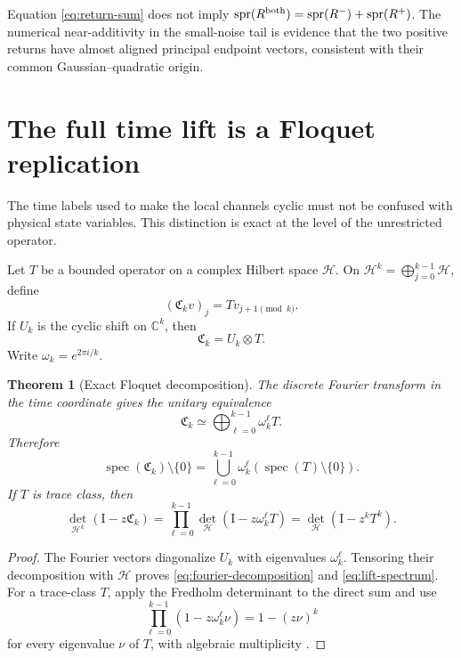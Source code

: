 \documentclass[11pt]{article}
\newtheorem{theorem}{Theorem}[section]
\theoremstyle{definition}
\theoremstyle{remark}
\newcommand{\C}{\mathbb C}
\newcommand{\Id}{\mathrm I}
\newcommand{\cH}{\mathcal H}
\newcommand{\spec}{\operatorname{spec}}
\newcommand{\spr}{\operatorname{spr}}
\begin{document}
Equation \eqref{eq:return-sum} does not imply
$\spr(R^{\rm both})=\spr(R^-)+\spr(R^+)$.  The numerical near-additivity in
the small-noise tail is evidence that the two positive returns have almost
aligned principal endpoint vectors, consistent with their common
Gaussian--quadratic origin.

\section{The full time lift is a Floquet replication}
\label{sec:floquet}

The time labels used to make the local channels cyclic must not be confused
with physical state variables.  This distinction is exact at the level of
the unrestricted operator.

Let $T$ be a bounded operator on a complex Hilbert space $\cH$.  On
$\cH^k=\bigoplus_{j=0}^{k-1}\cH$, define
\begin{equation}\label{eq:full-time-lift}
 (\mathfrak C_kv)_j=Tv_{j+1\pmod k}.
\end{equation}
If $U_k$ is the cyclic shift on $\C^k$, then
\begin{equation}\label{eq:tensor-lift}
 \mathfrak C_k=U_k\otimes T.
\end{equation}
Write $\omega_k=e^{2\pi i/k}$.

\begin{theorem}[Exact Floquet decomposition]
\label{thm:floquet}
The discrete Fourier transform in the time coordinate gives the unitary
equivalence
\begin{equation}\label{eq:fourier-decomposition}
 \boxed{
 \mathfrak C_k\simeq
 \bigoplus_{\ell=0}^{k-1}\omega_k^\ell T.}
\end{equation}
Therefore
\begin{equation}\label{eq:lift-spectrum}
 \spec(\mathfrak C_k)\setminus\{0\}
 =\bigcup_{\ell=0}^{k-1}
 \omega_k^\ell(\spec(T)\setminus\{0\}).
\end{equation}
If $T$ is trace class, then
\begin{equation}\label{eq:lift-determinant}
 \boxed{
 \det_{\cH^k}(\Id-z\mathfrak C_k)
 =\prod_{\ell=0}^{k-1}
 \det_{\cH}(\Id-z\omega_k^\ell T)
 =\det_{\cH}(\Id-z^kT^k).}
\end{equation}
\end{theorem}

\begin{proof}
The Fourier vectors diagonalize $U_k$ with eigenvalues
$\omega_k^\ell$.  Tensoring their decomposition with $\cH$ proves
\eqref{eq:fourier-decomposition} and \eqref{eq:lift-spectrum}.  For a
trace-class $T$, apply the Fredholm determinant to the direct sum and use
\[
 \prod_{\ell=0}^{k-1}(1-z\omega_k^\ell\nu)
 =1-(z\nu)^k
\]
for every eigenvalue $\nu$ of $T$, with algebraic multiplicity
\citep{GohbergKrein1969,Simon2005}.
\end{proof}
\end{document}
